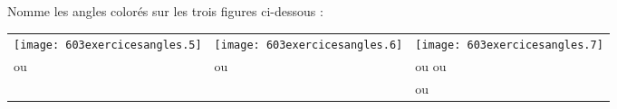 Nomme les angles colorés sur les trois figures ci-dessous :
\begin{center}
\begin{tabular}{m{4cm}|m{4cm}|m{4cm}}
\texttt{[image: 603exercicesangles.5]}&\texttt{[image: 603exercicesangles.6]}&\texttt{[image: 603exercicesangles.7]}\\
\dotfill ou \dotfill&\dotfill ou \dotfill&\dotfill ou \dotfill ou\\
&&\dotfill ou \dotfill\\
\end{tabular}
\end{center}
